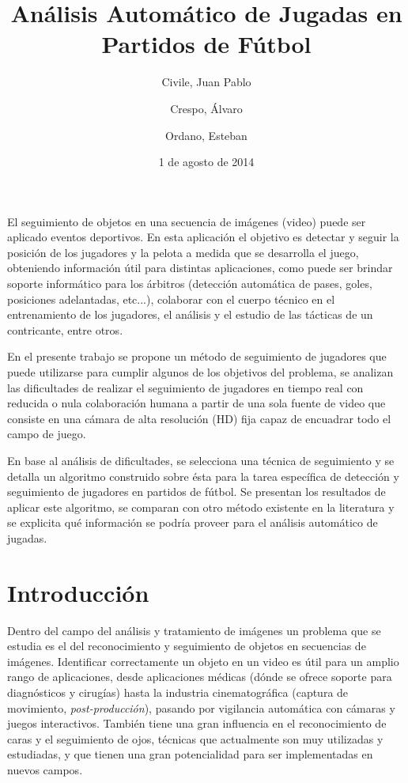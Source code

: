 \documentclass[a4paper,11pt]{report}
\title{Análisis Automático de Jugadas en Partidos de Fútbol}
\date{1 de agosto de 2014}
\author{Civile, Juan Pablo \and Crespo, Álvaro \and Ordano, Esteban }
\begin{document}
\pagestyle{fancy}
\maketitle

\addvspace{3em}
\begin{customabstract}
\begin{doublespace}
El seguimiento de objetos en una secuencia de imágenes (video) puede ser
aplicado eventos deportivos. En esta aplicación el objetivo es detectar y
seguir la posición de los jugadores y la pelota a medida
que se desarrolla el juego, obteniendo información útil para distintas
aplicaciones, como puede ser brindar soporte informático para los árbitros
(detección automática de pases, goles, posiciones adelantadas, etc...),
colaborar con el cuerpo técnico en el entrenamiento de los jugadores,
el análisis y el estudio de las tácticas de un contricante, entre otros.

En el presente trabajo se propone un método de seguimiento de jugadores que
puede utilizarse para cumplir algunos de los objetivos del problema,
se analizan las dificultades de realizar el seguimiento
de jugadores en tiempo real con reducida o nula colaboración humana a partir de
una sola fuente de video que consiste en una cámara de alta resolución (HD)
fija capaz de encuadrar todo el campo de juego.

En base al análisis de dificultades, se selecciona una técnica de seguimiento
y se detalla un algoritmo construido sobre ésta para la tarea específica de
detección y seguimiento de jugadores en partidos de fútbol. Se presentan los
resultados de aplicar este algoritmo, se comparan con otro método existente
en la literatura y se explicita qué información se podría proveer
para el análisis automático de jugadas.
\end{doublespace}
\end{customabstract}

\tableofcontents

\chapter*{Introducción}

Dentro del campo del análisis y tratamiento de imágenes un problema que se
estudia es el del reconocimiento y seguimiento de objetos en secuencias de
imágenes. Identificar correctamente un objeto en un video es útil para un
amplio rango de aplicaciones, desde aplicaciones médicas (dónde se ofrece
soporte para diagnósticos y cirugías) hasta la industria cinematográfica
(captura de movimiento, \textit{post-producción}), pasando por vigilancia
automática con cámaras y juegos interactivos. También tiene una gran
influencia en el reconocimiento de caras y el seguimiento de ojos, técnicas
que actualmente son muy utilizadas y estudiadas, y que tienen una gran
potencialidad para ser implementadas en nuevos campos.
\end{document}
